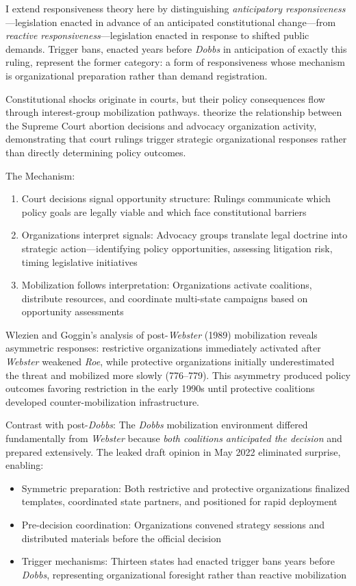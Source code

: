 I extend responsiveness theory here by distinguishing \textit{anticipatory responsiveness}---legislation enacted in advance of an anticipated constitutional change---from \textit{reactive responsiveness}---legislation enacted in response to shifted public demands. Trigger bans, enacted years before \textit{Dobbs} in anticipation of exactly this ruling, represent the former category: a form of responsiveness whose mechanism is organizational preparation rather than demand registration.

Constitutional shocks originate in courts, but their policy consequences flow through interest-group mobilization pathways. \textcite{wlezienCourtsInterestGroups1993} theorize the relationship between the Supreme Court abortion decisions and advocacy organization activity, demonstrating that court rulings trigger strategic organizational responses rather than directly determining policy outcomes.

The Mechanism:
\begin{enumerate}
    \item Court decisions signal opportunity structure: Rulings communicate which policy goals are legally viable and which face constitutional barriers
    \item Organizations interpret signals: Advocacy groups translate legal doctrine into strategic action---identifying policy opportunities, assessing litigation risk, timing legislative initiatives
    \item Mobilization follows interpretation: Organizations activate coalitions, distribute resources, and coordinate multi-state campaigns based on opportunity assessments
\end{enumerate}

Wlezien and Goggin's analysis of post-\textit{Webster} (1989) mobilization reveals asymmetric responses: restrictive organizations immediately activated after \textit{Webster} weakened \textit{Roe}, while protective organizations initially underestimated the threat and mobilized more slowly (776--779). This asymmetry produced policy outcomes favoring restriction in the early 1990s until protective coalitions developed counter-mobilization infrastructure.

Contrast with post-\textit{Dobbs}: The \textit{Dobbs} mobilization environment differed fundamentally from \textit{Webster} because \textit{both coalitions anticipated the decision} and prepared extensively. The leaked draft opinion in May 2022 eliminated surprise, enabling:
\begin{itemize}
    \item Symmetric preparation: Both restrictive and protective organizations finalized templates, coordinated state partners, and positioned for rapid deployment
    \item Pre-decision coordination: Organizations convened strategy sessions and distributed materials before the official decision
    \item Trigger mechanisms: Thirteen states had enacted trigger bans years before \textit{Dobbs}, representing organizational foresight rather than reactive mobilization \parencite{nash13StatesHave2022}
\end{itemize}


